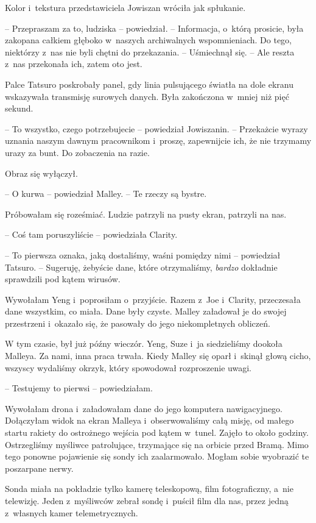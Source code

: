 \documentclass[oneside,polish,11pt,sfheadings]{mwbk}
\begin{document}
Kolor i~tekstura przedstawiciela Jowiszan wróciła jak spłukanie.

-- Przepraszam za to, ludziska -- powiedział. -- Informacja, o~którą
prosicie, była zakopana całkiem głęboko w~naszych archiwalnych
wspomnieniach. Do tego, niektórzy z~nas nie byli chętni do przekazania.
-- Uśmiechnął się. -- Ale reszta z~nas przekonała ich, zatem oto jest.

Palce Tatsuro poskrobały panel, gdy linia pulsującego światła na dole
ekranu wskazywała transmisję surowych danych. Była zakończona w~mniej
niż pięć sekund.

-- To wszystko, czego potrzebujecie -- powiedział Jowiszanin. -- Przekażcie
wyrazy uznania naszym dawnym pracownikom i~proszę, zapewnijcie ich, że
nie trzymamy urazy za bunt. Do zobaczenia na razie.

Obraz się wyłączył.

-- O kurwa -- powiedział Malley. -- Te rzeczy są bystre.

Próbowałam się roześmiać. Ludzie patrzyli na pusty ekran, patrzyli na
nas.

-- Coś tam poruszyliście -- powiedziała Clarity.

-- To pierwsza oznaka, jaką dostaliśmy, waśni pomiędzy nimi -- powiedział
Tatsuro. -- Sugeruję, żebyście dane, które otrzymaliśmy, \textit{bardzo}
dokładnie sprawdzili pod kątem wirusów.

Wywołałam Yeng i~poprosiłam o~przyjście. Razem z~Joe i~Clarity,
przeczesała dane wszystkim, co miała. Dane były czyste. Malley załadował
je do swojej przestrzeni i~okazało się, że pasowały do jego
niekompletnych obliczeń.

W tym czasie, był już późny wieczór. Yeng, Suze i~ja siedzieliśmy
dookoła Malleya. Za nami, inna praca trwała. Kiedy Malley się oparł i~skinął głową cicho, wszyscy wydaliśmy okrzyk, który spowodował
rozproszenie uwagi.

-- Testujemy to pierwsi -- powiedziałam.

Wywołałam drona i~załadowałam dane do jego komputera nawigacyjnego.
Dołączyłam widok na ekran Malleya i~obserwowaliśmy całą misję, od małego
startu rakiety do ostrożnego wejścia pod kątem w~tunel. Zajęło to około
godziny. Ostrzegliśmy myśliwce patrolujące, trzymające się na orbicie
przed Bramą. Mimo tego ponowne pojawienie się sondy ich zaalarmowało.
Mogłam sobie wyobrazić te poszarpane nerwy.

Sonda miała na pokładzie tylko kamerę teleskopową, film fotograficzny, a~nie telewizję. Jeden z~myśliwców zebrał sondę i~puścił film dla nas,
przez jedną z~własnych kamer telemetrycznych.
\end{document}
